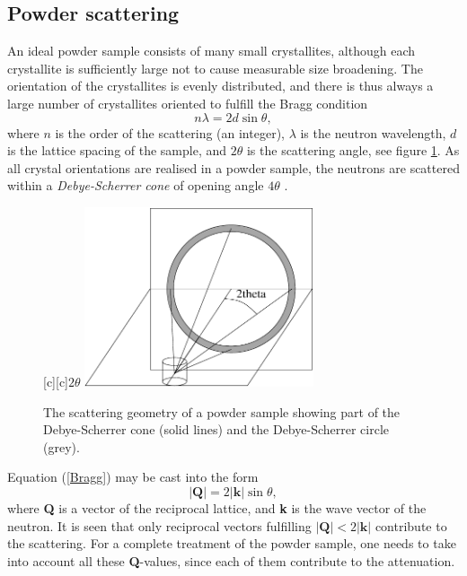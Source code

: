 \subsection{Powder scattering}
An ideal powder sample consists of many small
crystallites, although each crystallite is sufficiently
large not to cause measurable size broadening.
The orientation of the crystallites is evenly distributed,
and there is thus always a large number of
crystallites oriented to fulfill the Bragg condition
\begin{equation}   \label{Bragg}
n \lambda = 2 d \sin \theta ,
\end{equation}
where $n$ is the order of the scattering (an integer), $\lambda$
is the neutron wavelength, $d$ is the lattice spacing of the sample,
and $2 \theta$ is the scattering angle, see figure \ref{coneFig}.
As all crystal orientations
are realised in a powder sample, the neutrons are scattered within a
{\em Debye-Scherrer cone} of opening angle $4 \theta$ \cite{bacon}.

\begin{figure}
  \begin{center}
    [c][c]{$2\theta$}
    \includegraphics[width=0.6\textwidth]{figures/powder}
  \end{center}
\caption{The scattering geometry of a powder sample showing part of the
Debye-Scherrer cone (solid lines) and the Debye-Scherrer circle (grey).}
\label{coneFig}
\end{figure}

Equation (\ref{Bragg}) may be cast into the form
\begin{equation}
|\textbf{Q}| = 2 |\textbf{k}| \sin \theta ,
\end{equation}
where \textbf{Q} is a vector of the reciprocal lattice, and \textbf{k} is
the wave vector of the neutron. It is seen that only
reciprocal vectors fulfilling $|\textbf{Q}| < 2 |\textbf{k}|$
contribute to the scattering.
For a complete treatment of the powder sample, one needs to take
into account all these \textbf{Q}-values, since each of them contribute
to the attenuation.

